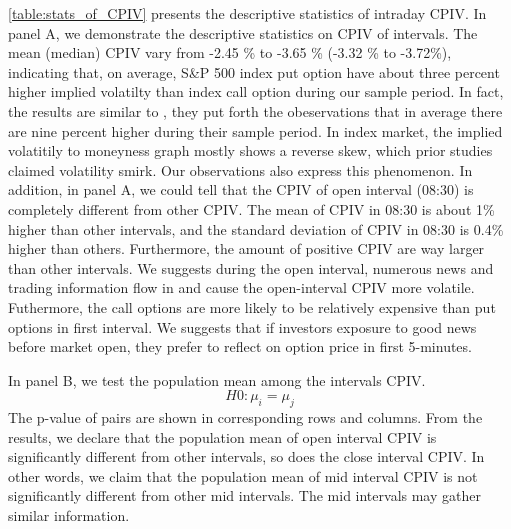 \autoref{table:stats_of_CPIV} presents the descriptive statistics of intraday CPIV. In panel A, we demonstrate the descriptive statistics on CPIV of intervals. The mean (median) CPIV vary from -2.45 \% to -3.65 \% (-3.32 \% to -3.72\%), indicating that, on average, S\&P 500 index put option have about three percent higher implied volatilty than index call option during our sample period. In fact, the results are similar to \textcite{atilgan2015implied}, they put forth the obeservations that in average there are nine percent higher during their sample period. In index market, the implied volatitily to moneyness graph mostly shows a reverse skew, which prior studies \parencite{zhang2008implied} claimed volatility smirk. Our observations also express this phenomenon. In addition, in panel A, we could tell that the CPIV of open interval (08:30) is completely different from other CPIV. The mean of CPIV in 08:30 is about 1\% higher than other intervals, and the standard deviation of CPIV in 08:30 is 0.4\% higher than others. Furthermore, the amount of positive CPIV are way larger than other intervals. We suggests during the open interval, numerous news and trading information flow in and cause the open-interval CPIV more volatile. Futhermore, the call options are more likely to be relatively expensive than put options in first interval. We suggests that if investors exposure to good news before market open, they prefer to reflect on option price in first 5-minutes.  

In panel B, we test the population mean among the intervals CPIV. 
\begin{equation}
H0: \mu _{i} = \mu _{j}
\end{equation}
The p-value of pairs are shown in corresponding rows and columns. From the results, we declare that the population mean of open interval CPIV is significantly different from other intervals, so does the close interval CPIV. In other words, we claim that the population mean of mid interval CPIV is not significantly different from other mid intervals. The mid intervals may gather similar information. 






%


